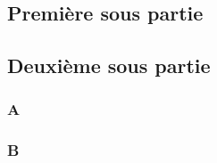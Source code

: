\subsection{Première sous partie}

\lipsum[2]

\subsection{Deuxième sous partie}

\subsubsection{A}

\lipsum[2]

\subsubsection{B}

\lipsum[2]
